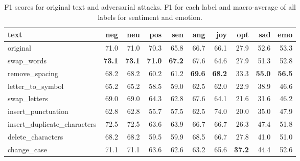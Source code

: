 \documentclass[11pt,a4paper]{article}
\begin{document}
\begin{table}[ht]
\centering
\begin{tabular}{l|rrr|r|rrrr|r}
\toprule
                       text &  neg &  neu &  pos &  sen &  ang &  joy &  opt &  sad &  emo \\
\midrule
                       original &      71.0 &     71.0 &      70.3 &       65.8 &   66.7 & 66.1 &      27.9 &     52.6 &     53.3 \\
                 swap\_words &      \textbf{73.1} &     \textbf{73.1} &      \textbf{71.0} &       \textbf{67.2} &   67.6 & 64.6 &      27.9 &     51.3 &     52.8 \\
             remove\_spacing &      68.2 &     68.2 &      60.2 &       61.2 &   \textbf{69.6} & \textbf{68.2} &      33.3 &     \textbf{55.0} &     \textbf{56.5} \\
           letter\_to\_symbol &      65.2 &     65.2 &      58.5 &       59.0 &   62.5 & 62.0 &      22.9 &     38.9 &     46.6 \\
               swap\_letters &      69.0 &     69.0 &      64.3 &       62.8 &   67.6 & 64.1 &      21.6 &     31.6 &     46.2 \\
         insert\_punctuation &      62.8 &     62.8 &      55.7 &       57.5 &   62.5 & 74.0 &      20.0 &     35.0 &     47.9 \\
insert\_duplicate\_characters &      72.5 &     72.5 &      63.6 &       63.9 &   66.7 & 66.7 &      26.3 &     47.4 &     51.8 \\
          delete\_characters &      68.2 &     68.2 &      59.5 &       59.9 &   68.5 & 66.7 &      27.8 &     41.0 &     51.0 \\
                change\_case &      71.1 &     71.1 &      63.6 &       62.6 &   63.2 & 65.6 &      \textbf{37.2} &     44.4 &     52.6 \\
\bottomrule
\end{tabular}
\caption{F1 scores for original text and adversarial attacks. F1 for each label and macro-average of all labels for sentiment and emotion.}
\label{tab:f1_scores}
\end{table}
\end{document}
